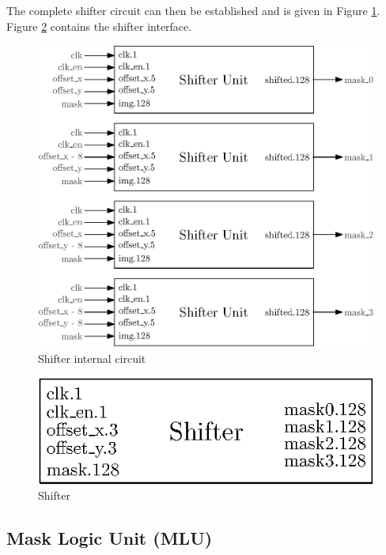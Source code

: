 The complete shifter circuit can then be established and is given in Figure \ref{fig:gpu/shifter_in}. 
Figure \ref{fig:gpu/shifter} contains the shifter interface.

\begin{figure}[H]
    \centering
    \includegraphics[scale=1.0]{Chapter4-GPU_CLKU/res/shifter_in}
    \caption{Shifter internal circuit}
    \label{fig:gpu/shifter_in}
\end{figure}

\begin{figure}[H]
    \centering
    \includegraphics[scale=1.0]{Chapter4-GPU_CLKU/res/shifter}
    \caption{Shifter}
    \label{fig:gpu/shifter}
\end{figure}


\subsection{Mask Logic Unit (MLU)}

